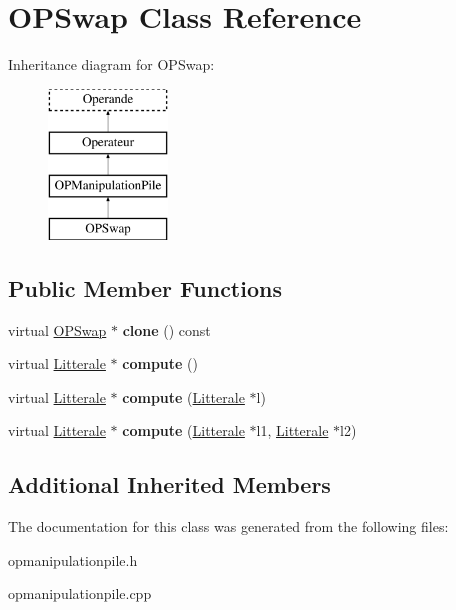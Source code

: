 \hypertarget{class_o_p_swap}{}\section{O\+P\+Swap Class Reference}
\label{class_o_p_swap}
Inheritance diagram for O\+P\+Swap\+:\begin{figure}[H]
\begin{center}
\leavevmode
\includegraphics[height=4.000000cm]{class_o_p_swap}
\end{center}
\end{figure}
\subsection*{Public Member Functions}
\begin{DoxyCompactItemize}
\item 
virtual \hyperlink{class_o_p_swap}{O\+P\+Swap} $\ast$ {\bfseries clone} () const \hypertarget{class_o_p_swap_a6ec92b4e33b2cdeef35e04e22e48e433}{}\label{class_o_p_swap_a6ec92b4e33b2cdeef35e04e22e48e433}

\item 
virtual \hyperlink{class_litterale}{Litterale} $\ast$ {\bfseries compute} ()\hypertarget{class_o_p_swap_aab3a06a4ddefe008a5fa771efea2b41c}{}\label{class_o_p_swap_aab3a06a4ddefe008a5fa771efea2b41c}

\item 
virtual \hyperlink{class_litterale}{Litterale} $\ast$ {\bfseries compute} (\hyperlink{class_litterale}{Litterale} $\ast$l)\hypertarget{class_o_p_swap_a0d3ddab48fcd270c4df00a22e2d5cd6f}{}\label{class_o_p_swap_a0d3ddab48fcd270c4df00a22e2d5cd6f}

\item 
virtual \hyperlink{class_litterale}{Litterale} $\ast$ {\bfseries compute} (\hyperlink{class_litterale}{Litterale} $\ast$l1, \hyperlink{class_litterale}{Litterale} $\ast$l2)\hypertarget{class_o_p_swap_a1ca0b42e1bc12addd98b2640ce5f93b7}{}\label{class_o_p_swap_a1ca0b42e1bc12addd98b2640ce5f93b7}

\end{DoxyCompactItemize}
\subsection*{Additional Inherited Members}


The documentation for this class was generated from the following files\+:\begin{DoxyCompactItemize}
\item 
opmanipulationpile.\+h\item 
opmanipulationpile.\+cpp\end{DoxyCompactItemize}
